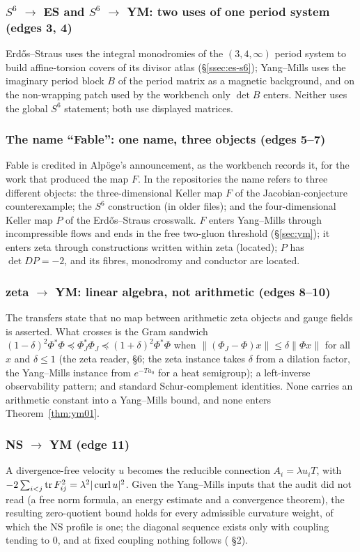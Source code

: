 \subsubsection{\texorpdfstring{$S^6$}{S6} \texorpdfstring{$\to$}{to} ES and \texorpdfstring{$S^6$}{S6} \texorpdfstring{$\to$}{to} YM: two uses of one period system (edges 3, 4)}
Erdős--Straus uses the integral monodromies of the $(3,4,\infty)$ period system to build affine-torsion covers of its divisor atlas (§\ref{ssec:es-s6}); Yang--Mills uses the imaginary period block $B$ of the period matrix as a magnetic background, and on the non-wrapping patch used by the workbench only $\det B$ enters. Neither uses the global $S^6$ statement; both use displayed matrices.

\subsubsection{The name ``Fable'': one name, three objects (edges 5--7)}
Fable is credited in Alpöge's announcement, as the workbench records it, for the work that produced the map $F$. In the repositories the name refers to three different objects: the three-dimensional Keller map $F$ of the Jacobian-conjecture counterexample; the $S^6$ construction (in older files); and the four-dimensional Keller map $P$ of the Erdős--Straus crosswalk. $F$ enters Yang--Mills through incompressible flows and ends in the free two-gluon threshold (§\ref{sec:ym}); it enters zeta through constructions written within zeta (located); $P$ has $\det DP=-2$, and its fibres, monodromy and conductor are located.

\subsubsection{zeta \texorpdfstring{$\to$}{to} YM: linear algebra, not arithmetic (edges 8--10)}
The transfers state that no map between arithmetic zeta objects and gauge fields is asserted. What crosses is the Gram sandwich $(1-\delta)^2\Phi^*\Phi\preceq\Phi_J^*\Phi_J\preceq(1+\delta)^2\Phi^*\Phi$ when $\|(\Phi_J-\Phi)x\|\le\delta\|\Phi x\|$ for all $x$ and $\delta\le1$ (the zeta reader, §6; the zeta instance takes $\delta$ from a dilation factor, the Yang--Mills instance from $e^{-Ta_0}$ for a heat semigroup); a left-inverse observability pattern; and standard Schur-complement identities. None carries an arithmetic constant into a Yang--Mills bound, and none enters Theorem~\ref{thm:ym01}.

\subsubsection{NS \texorpdfstring{$\to$}{to} YM (edge 11)}
A divergence-free velocity $u$ becomes the reducible connection $A_i=\lambda u_iT$, with $-2\sum_{i<j}\operatorname{tr} F_{ij}^2=\lambda^2|\operatorname{curl}u|^2$. Given the Yang--Mills inputs that the audit did not read (a free norm formula, an energy estimate and a convergence theorem), the resulting zero-quotient bound holds for every admissible curvature weight, of which the NS profile is one; the diagonal sequence exists only with coupling tending to $0$, and at fixed coupling nothing follows ( §2).

